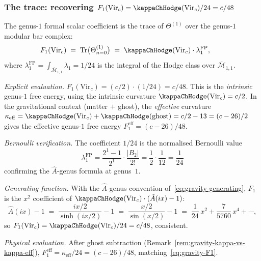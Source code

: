\subsubsection*{The trace: recovering $F_1(\mathrm{Vir}_c)=\kappaChHodge(\mathrm{Vir}_c)/24=c/48$}

\begin{computation}
\label{comp:genus1-free-energy}
The genus-$1$ formal scalar coefficient is the trace of $\Theta^{(1)}$
over the genus-$1$ modular bar complex:
\begin{equation}\label{eq:genus1-trace}
F_1(\mathrm{Vir}_c)
\;=\;
\mathrm{Tr}\bigl(\Theta^{(1)}_{n=0}\bigr)
\;=\;
\kappaChHodge(\mathrm{Vir}_c) \cdot \lambda_1^{\mathrm{FP}},
\qquad \end{equation}
where $\lambda_1^{\mathrm{FP}}
= \int_{\overline{\mathcal{M}}_{1,1}} \lambda_1
= 1/24$ is the integral of the Hodge class over
$\overline{\mathcal{M}}_{1,1}$.

\emph{Explicit evaluation.}
$F_1(\mathrm{Vir}_c) = (c/2) \cdot (1/24) = c/48$. This is the
\emph{intrinsic} genus-$1$ free energy, using the intrinsic
curvature $\kappaChHodge(\mathrm{Vir}_c) = c/2$. In the gravitational
context (matter $+$ ghost), the \emph{effective} curvature
$\kappa_{\mathrm{eff}} = \kappaChHodge(\mathrm{Vir}_c) +
\kappaChHodge(\mathrm{ghost}) = c/2 - 13 = (c-26)/2$ gives the effective
genus-$1$ free energy $F_1^{\mathrm{eff}} = (c-26)/48$.

\emph{Bernoulli verification.} The coefficient $1/24$ is the
normalised Bernoulli value
\[
\lambda_1^{\mathrm{FP}}
= \frac{2^1-1}{2^1}\cdot\frac{|B_2|}{2!}
= \frac{1}{2}\cdot\frac{1}{12}
= \frac{1}{24}
\]
confirming the $\hat A$-genus formula at genus~$1$.

\emph{Generating function.}
With the $\hat A$-genus convention of~\eqref{eq:gravity-generating},
$F_1$ is the $x^2$ coefficient of
$\kappaChHodge(\mathrm{Vir}_c) \cdot (\hat A(ix) - 1)$:
\[
\hat A(ix) - 1
\;=\;
\frac{ix/2}{\sinh(ix/2)} - 1
\;=\;
\frac{x/2}{\sin(x/2)} - 1
\;=\;
\frac{1}{24}\,x^2 + \frac{7}{5760}\,x^4 + \cdots,
\]
so \(F_1(\mathrm{Vir}_c)=\kappaChHodge(\mathrm{Vir}_c)/24=c/48\),
consistent.

\emph{Physical evaluation.}
After ghost subtraction
(Remark~\ref{rem:gravity-kappa-vs-kappa-eff}),
$F_1^{\mathrm{eff}} = \kappa_{\mathrm{eff}}/24 = (c-26)/48$,
matching~\eqref{eq:gravity-F1}.


\end{computation}
